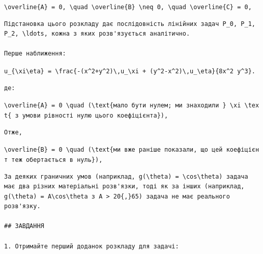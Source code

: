 \documentclass[
  ukrainian,
]{article}
\begin{document}
\texttt{\textbackslash{}overline\{A\}\ =\ 0,\ \textbackslash{}quad\ \textbackslash{}overline\{B\}\ \textbackslash{}neq\ 0,\ \textbackslash{}quad\ \textbackslash{}overline\{C\}\ =\ 0,}

\begin{verbatim}
Підстановка цього розкладу дає послідовність лінійних задач P_0, P_1, P_2, \ldots, кожна з яких розв'язується аналітично.

Перше наближення:
\end{verbatim}

\texttt{u\_\{\textbackslash{}xi\textbackslash{}eta\}\ =\ \textbackslash{}frac\{-(x\^{}2+y\^{}2)\textbackslash{},u\_\textbackslash{}xi\ +\ (y\^{}2-x\^{}2)\textbackslash{},u\_\textbackslash{}eta\}\{8x\^{}2\ y\^{}3\}.}

\begin{verbatim}
де:
\end{verbatim}

\texttt{\textbackslash{}overline\{A\}\ =\ 0\ \textbackslash{}quad\ (\textbackslash{}text\{мало\ бути\ нулем;\ ми\ знаходили\ \}\ \textbackslash{}xi\ \textbackslash{}text\{\ з\ умови\ рівності\ нулю\ цього\ коефіцієнта\}),}

\begin{verbatim}
Отже,
\end{verbatim}

\texttt{\textbackslash{}overline\{B\}\ =\ 0\ \textbackslash{}quad\ (\textbackslash{}text\{ми\ вже\ раніше\ показали,\ що\ цей\ коефіцієнт\ теж\ обертається\ в\ нуль\}),}

\begin{verbatim}
За деяких граничних умов (наприклад, g(\theta) = \cos\theta) задача має два різних матеріальні розв'язки, тоді як за інших (наприклад, g(\theta) = A\cos\theta з A > 20{,}65) задача не має реального розв'язку.

## ЗАВДАННЯ

1. Отримайте перший доданок розкладу для задачі:
\end{verbatim}
\end{document}
